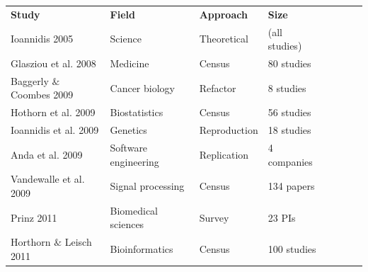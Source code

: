 \documentclass{drexelthesis}
\begin{document}
\newpage
\begin{table}[H]
\begin{adjustbox}{max width=\textwidth}
\begin{tabular}{p{3.86cm}p{4.12cm}p{4.29cm}p{4.24cm}p{3.86cm}p{4.12cm}p{4.29cm}p{4.24cm}}
\multicolumn{1}{p{3.86cm}}{\textbf{Study}} & 
\multicolumn{1}{p{4.12cm}}{\textbf{Field}} & 
\multicolumn{1}{p{4.29cm}}{\textbf{Approach}} & 
\multicolumn{1}{p{4.24cm}}{\textbf{Size}} \\ 
\multicolumn{1}{p{3.86cm}}{Ioannidis 2005 \cite{Ioannidis2005-se}} & 
\multicolumn{1}{p{4.12cm}}{Science} & 
\multicolumn{1}{p{4.29cm}}{Theoretical} & 
\multicolumn{1}{p{4.24cm}}{(all studies)} \\ 
\multicolumn{1}{p{3.86cm}}{Glasziou et al. 2008 \cite{Glasziou2008-of}} & 
\multicolumn{1}{p{4.12cm}}{Medicine} & 
\multicolumn{1}{p{4.29cm}}{Census} & 
\multicolumn{1}{p{4.24cm}}{80 studies} \\ 
\multicolumn{1}{p{3.86cm}}{Baggerly $\&$ Coombes 2009 \cite{Baggerly2010-gt}} & 
\multicolumn{1}{p{4.12cm}}{Cancer biology} & 
\multicolumn{1}{p{4.29cm}}{Refactor} & 
\multicolumn{1}{p{4.24cm}}{8 studies} \\ 
\multicolumn{1}{p{3.86cm}}{Hothorn et al. 2009 \cite{Hothorn2009-sx}} & 
\multicolumn{1}{p{4.12cm}}{Biostatistics} & 
\multicolumn{1}{p{4.29cm}}{Census} & 
\multicolumn{1}{p{4.24cm}}{56 studies} \\ 
\multicolumn{1}{p{3.86cm}}{Ioannidis et al. 2009 \cite{Ioannidis2009-at}} & 
\multicolumn{1}{p{4.12cm}}{Genetics} & 
\multicolumn{1}{p{4.29cm}}{Reproduction} & 
\multicolumn{1}{p{4.24cm}}{18 studies} \\ 
\multicolumn{1}{p{3.86cm}}{Anda et al. 2009 \cite{Anda2009-lr}} & 
\multicolumn{1}{p{4.12cm}}{Software engineering} & 
\multicolumn{1}{p{4.29cm}}{Replication} & 
\multicolumn{1}{p{4.24cm}}{4 companies} \\ 
\multicolumn{1}{p{3.86cm}}{Vandewalle et al. 2009 \cite{Vandewalle2009-pe}} & 
\multicolumn{1}{p{4.12cm}}{Signal processing} & 
\multicolumn{1}{p{4.29cm}}{Census} & 
\multicolumn{1}{p{4.24cm}}{134 papers} \\ 
\multicolumn{1}{p{3.86cm}}{Prinz 2011 \cite{Prinz2011-ej}} & 
\multicolumn{1}{p{4.12cm}}{Biomedical sciences} & 
\multicolumn{1}{p{4.29cm}}{Survey} & 
\multicolumn{1}{p{4.24cm}}{23 PIs} \\ 
\multicolumn{1}{p{3.86cm}}{Horthorn $\&$ Leisch 2011 \cite{Hothorn2011-pb}} & 
\multicolumn{1}{p{4.12cm}}{Bioinformatics} & 
\multicolumn{1}{p{4.29cm}}{Census} & 
\multicolumn{1}{p{4.24cm}}{100 studies} \\ 

\end{tabular}
\end{adjustbox}
\end{table}
\end{document}
